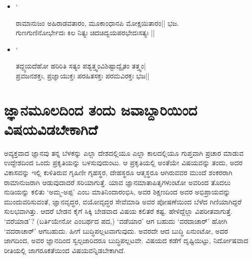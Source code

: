 \begin{itemize}

 `

\item[] `
\begin{shloka}
ರಾಮಾನುಜಂ ಅಹಿರಾಡವತಾರಂ, ಮೂಕಾಂಧಾನಪಿ ಮೋಕ್ಷಯಿತಾರಂ|| ಭಜ.\\
ಗುಣಗುಣಿನೋರ್ಭೇದಃ ಕಿಲ ನಿತ್ಯಃ ಚಿದಚಿದ್ವಯಪರಭೇದಃಸತ್ಯಃ || 
\end{shloka}

\item[] `
\begin{shloka}
ತದ್ದ್ವಯದೆಹೋ ಹರಿರಿತಿ ಸತ್ಯಂ ಪಶ್ಯತ್ತ್ವಂವಿಶಿಷ್ಟಾದ್ವೈತಂ ತತ್ತ್ವಂ|\\
ಪ್ರವಜನಶಕ್ತಃ, ಪ್ರಜ್ಞಾಯುಕ್ತಃ ಪರಹಿತಸಕ್ತಃ ಪರಮವಿರಕ್ತಃ ಭಜ||
\end{shloka}

 

\end{itemize}

\section*{ಜ್ಞಾನಮೂಲದಿಂದ ತಂದು ಜವಾಬ್ದಾರಿಯಿಂದ ವಿಷಯವಿಡಬೇಕಾಗಿದೆ}

ಅವ್ಯಕ್ತವಾದ ಜ್ಞಾನವು ತನ್ನ ಬೆಳಕನ್ನು ಎಲ್ಲಾ ದೇಶದಲ್ಲಿಯೂ ಎಲ್ಲಾ ಕಾಲದಲ್ಲಿಯೂ ಗುಪ್ತವಾಗಿ ಪ್ರಚಾರ ಮಾಡುವ ಉದ್ದೇಶದಿಂದ ಒಂದು ಪ್ರಕೃತಿಯನ್ನು ಬಳಸುವುದುಂಟು. ಆ ಪ್ರಕೃತಿಯಲ್ಲಿ ಅಂತೆಯೇ ವಿಷಯವನ್ನು ತಂದು, ಅದರ ವಿಕಾಸವನ್ನು ಇಲ್ಲಿ ಕುಳಿತಿರುವ ಗೃಹಿಣೀ ಗೃಹಸ್ಥರ, ದೇಹಸ್ಥರೂ ಆತ್ಮಸ್ಥರೂ ಆಗಿರುವವರ ಮುಂದೆ ಶಂಕರರಾಗಿ ರಾಮಾನುಜರಾಗಿ ಆಡುವುದಾದರೆ ಸರಿಯಾಗುತ್ತೆ. ಯಾವ ಜ್ಞಾನಮಾತಾಪಿತೃಗಳುಂಟೋ ಅವರಿಂದ ತೊದಲು ನುಡಿಯನ್ನು ಕಲಿತು `ಅಮ್ಮ-ಅಪ್ಪ' ಎಂಬ ಮಾತಿನಿಂದಾರಂಭಿಸಿ, ಅವರ ಶಿಕ್ಷಣದಿಂದ ಅವರ ಅಭಿಪ್ರಾಯವನ್ನು ಮುಂದುವರಿಸುವಂತೆ, ಜ್ಞಾನವೃದ್ಧರ, ವಯೋವೃದ್ಧರ ಸೇವೆಮಾಡಿ ಅವರ ಪೋಷಣೆಯಿಂದ ಬೆಳೆದ ಗಿಣಿಯಾಗಿದ್ದರೆ ಸುಲಭವಾಗಿತ್ತು. ಆದರೆ ಬೇಡನ ಕೈಗೆ ಸಿಕ್ಕಿ ಬೇಡವಾದ ವಿಷಯ ಕಲಿತರೆ ಕಷ್ಟ. ಹೇಳಿದ್ದೆಲ್ಲಾ ವಿಪರೀತವಾಗುತ್ತೆ. `ವರೆಯಾಡ'? (ಬರ್ತಿಯೇನೋ ಎಂಬರ್ಥದ ಪದ,) `ವಡೆಯಾರ' ಆಗ ಬಹುದು `ವರದಾಚಾರ್' ಹೋಗಿ `ವದರಾಚಾರ್' ಆಗಬಹುದು. ಹೀಗೆ ಬುದ್ಧಿಪಲ್ಲಟವಾಗುವುದು. ಅವರದೇ ಆದ ಬುದ್ಧಿ ಏನುಂಟೋ, ಅದರ ಜಾಗದಿಂದ, ಅವರ ಜ್ಞಾನದಿಂದ ಸ್ವಲ್ಪಜಾರಿದರೂ ಬುದ್ಧಿಪಲ್ಲಟವೇ. ವಿಷಯದ ಕಡೆಗೆ ದೃಷ್ಟಿಯಿಟ್ಟು, ನಿರ್ದೋಷವಾದ ರೀತಿಯಲ್ಲಿ ಜಾಗರೂಕತೆಯಿಂದ ವಿಷಯವನ್ನಿಡಬೇಕಾಗಿದೆ.

